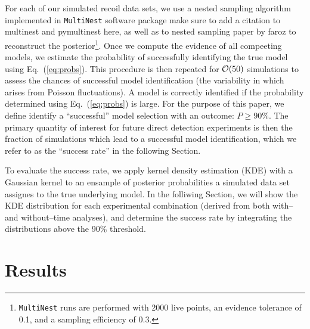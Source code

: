 \documentclass[11pt]{article}
\newcommand{\Eq}[1]{Eq.~(\ref{#1})} \newcommand{\Eqs}[2]{Eqs.~(\ref{#1}) and (\ref{#2})} \newcommand{\Eqm}[2]{Eqs.~(\ref{#1}) through (\ref{#2})}
\newcommand{\vgColor}{magenta}
\newcommand{\vg}[1]{{\color{\vgColor} #1}}
\begin{document}
For each of our simulated recoil data sets, we use a nested sampling algorithm implemented in \texttt{MultiNest} software package \cite{pymultinest,Feroz:2008xx} \vg{make sure to add a citation to multinest and pymultinest here, as well as to nested sampling paper by faroz} to reconstruct the posterior\footnote{\texttt{MultiNest} runs are performed with 2000 live points, an evidence tolerance of 0.1, and a sampling efficiency of 0.3.}. Once we compute the evidence of all compeeting models, we estimate the probability of successfully identifying the true model using \Eq{eq:probs}. This procedure is then repeated for ${\cal O}(50)$ simulations to assess the chances of successful model identification (the variability in which arises from Poisson fluctuations). A model is correctly identified if the probability determined using \Eq{eq:probs} is large. For the purpose of this paper, we define identify a ``successful'' model selection with an outcome: $P \geq 90\%$. The primary quantity of interest for future direct detection experiments is then the fraction of simulations which lead to a successful model identification, which we refer to as the ``success rate'' in the following Section.    

To evaluate the success rate, we apply kernel density estimation (KDE) with a Gaussian kernel to an ensample of posterior probabilities a simulated data set assignes to the true underlying model. In the folliwing Section, we will show the KDE distribution for each experimental combination (derived from both with-- and without--time analyses), and determine the success rate by integrating the distributions above the 90\% threshold. 


\section{Results}\label{sec:results}
\end{document}
